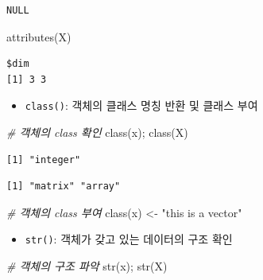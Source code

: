 \documentclass[
  11pt,
]{krantz}
\newenvironment{Shaded}{\begin{snugshade}}{\end{snugshade}}
\newcommand{\CommentTok}[1]{\textcolor[rgb]{0.37,0.37,0.37}{\textit{#1}}}
\newcommand{\FunctionTok}[1]{\textcolor[rgb]{0,0,0}{#1}}
\newcommand{\NormalTok}[1]{#1}
\newcommand{\OtherTok}[1]{\textcolor[rgb]{0.37,0.37,0.37}{#1}}
\newcommand{\StringTok}[1]{\textcolor[rgb]{0.5,0.5,0.5}{#1}}
\providecommand{\tightlist}{%
  \setlength{\itemsep}{0pt}\setlength{\parskip}{0pt}}
\begin{document}
\begin{verbatim}
NULL
\end{verbatim}

\begin{Shaded}
\begin{Highlighting}[]
\FunctionTok{attributes}\NormalTok{(X)}
\end{Highlighting}
\end{Shaded}

\begin{verbatim}
$dim
[1] 3 3
\end{verbatim}

\normalsize

\begin{itemize}
\tightlist
\item
  \texttt{class()}: 객체의 클래스 명칭 반환 및 클래스 부여
\end{itemize}

\footnotesize

\begin{Shaded}
\begin{Highlighting}[]
\CommentTok{\# 객체의 class 확인}
\FunctionTok{class}\NormalTok{(x); }\FunctionTok{class}\NormalTok{(X)}
\end{Highlighting}
\end{Shaded}

\begin{verbatim}
[1] "integer"
\end{verbatim}

\begin{verbatim}
[1] "matrix" "array" 
\end{verbatim}

\begin{Shaded}
\begin{Highlighting}[]
\CommentTok{\# 객체의 class 부여}
\FunctionTok{class}\NormalTok{(x) }\OtherTok{\textless{}{-}} \StringTok{"this is a vector"}
\end{Highlighting}
\end{Shaded}

\normalsize

\begin{itemize}
\tightlist
\item
  \texttt{str()}: 객체가 갖고 있는 데이터의 구조 확인
\end{itemize}

\footnotesize

\begin{Shaded}
\begin{Highlighting}[]
\CommentTok{\# 객체의 구조 파악}
\FunctionTok{str}\NormalTok{(x); }\FunctionTok{str}\NormalTok{(X)}
\end{Highlighting}
\end{Shaded}
\end{document}
